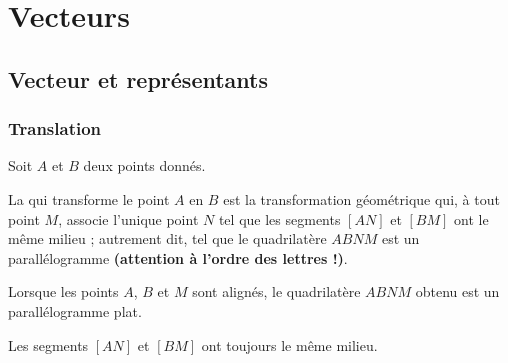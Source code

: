 \documentclass[10pt,openright,twoside,french]{book}
\begin{document}
\renewcommand\PartProgramme{Géométrie}
\chapter{Vecteurs}\label{ch_vecteurs}

\section{Vecteur et représentants}

\subsection{Translation}

\begin{Defi}\label{Defi_Translation}
    Soit $A$ et $B$ deux points donnés.\par
    La  qui transforme le point $A$ en $B$ est la transformation géométrique qui, à tout point $M$, associe l'unique point $N$ tel que les segments $[AN]$ et $[BM]$ ont le même milieu ; autrement dit, tel que le quadrilatère $ABNM$ est un parallélogramme \textbf{(attention à l'ordre des lettres !)}.
    \begin{center}
    \end{center}
\end{Defi}

\begin{Rmq}
    Lorsque les points $A$, $B$ et $M$ sont alignés, le quadrilatère $ABNM$ obtenu est un parallélogramme plat.\par
    Les segments $[AN]$ et $[BM]$ ont toujours le même milieu.
\end{Rmq}
\end{document}
